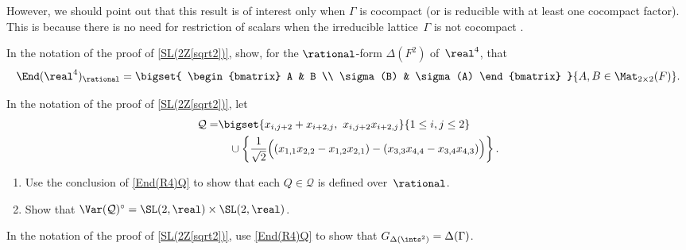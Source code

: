 However, we should point out that this result is of interest only when $\Gamma$ is cocompact (or is reducible with at least one cocompact factor). This is because there is no need for restriction of scalars when the irreducible lattice~$\Gamma$ is not cocompact .

\begin{exercises}

\item \label{End(R4)Q}
 In the notation of the proof of \cref{SL(2Z[sqrt2])},
show, for the $\rational$-form $\Delta(F^2)$ of~$\real^4$,
that
 $$ \End(\real^4)_{\rational}
 = \bigset{
 \begin{bmatrix}
 A & B \\
 \sigma(B) & \sigma(A)
 \end{bmatrix}
 }{
 A,B \in \Mat_{2 \times 2}(F)
 } .$$

\item \label{SL2xSL2Defd/Q}
 In the notation of the proof of \cref{SL(2Z[sqrt2])},
let 
 \begin{align*}
  \mathcal{Q} = &\bigset{ x_{i,j+2}  + x_{i+2,j}, ~ x_{i,j+2} x_{i+2,j} }{  1 \le i, j \le 2 }
	\\& \quad \cup \left\{ \frac{1}{\sqrt{2}} \Bigl( (x_{1,1} x_{2,2} - x_{1,2} x_{2,1}) - (x_{3,3} x_{4,4} - x_{3,4} x_{4,3}) \Bigr) \right\} 
	. \end{align*}
 \begin{enumerate}
 \item Use the conclusion of \cref{End(R4)Q} to show
that each $Q \in \mathcal{Q}$ is defined over~$\rational$.
 \item Show that $\Var(\mathcal{Q})^\circ = \SL(2,\real)
\times \SL(2,\real)$.
 \end{enumerate}

\item \label{SL2xSL2-Delta(Gamma)=}
 In the notation of the proof of \cref{SL(2Z[sqrt2])},
use \cref{End(R4)Q} to show that
$G_{\Delta(\ints^2)} = \Delta(\Gamma)$.


\end{exercises}

